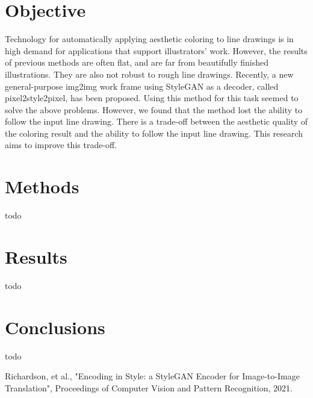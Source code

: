 \documentclass[a4paper]{article}
\newcommand{\aftersection}{\vspace{-5pt}}
\newcommand{\beforesection}{\vspace{-10pt}}
\begin{document}
\vspace{-25pt}
\begin{multicols}{2}
\section*{Objective}
\aftersection
Technology for automatically applying aesthetic coloring to line drawings is in high demand for applications that support illustrators' work. However, the results of previous methods are often flat, and are far from beautifully finished illustrations. They are also not robust to rough line drawings. Recently, a new general-purpose img2img work frame using StyleGAN as a decoder, called pixel2style2pixel, has been proposed. Using this method for this task seemed to solve the above problems. However, we found that the method lost the ability to follow the input line drawing. There is a trade-off between the aesthetic quality of the coloring result and the ability to follow the input line drawing. This research aims to improve this trade-off.
\beforesection
\section*{Methods}
\aftersection
todo

\beforesection
\section*{Results}
\aftersection
todo

\beforesection
\section*{Conclusions}
\aftersection

todo

\begin{thebibliography}{9}
Richardson, et al., "Encoding in Style: a StyleGAN Encoder for Image-to-Image Translation", Proceedings of Computer Vision and Pattern Recognition, 2021. 
\end{thebibliography}

\end{multicols}
\end{document}

